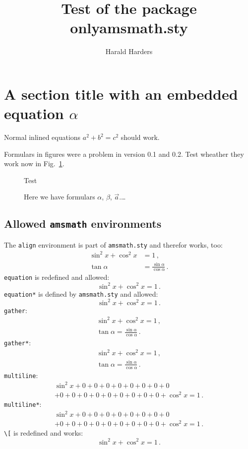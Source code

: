 \documentclass[fleqn]{article}
\begin{document}
\author{Harald Harders}
\title{Test of the package onlyamsmath.sty}

\maketitle
\tableofcontents
\listoffigures

\section{A section title with an embedded equation $\alpha$}

Normal inlined equations $a^2+b^2=c^2$ should work.

Formulars in figures were a problem in version 0.1 and 0.2. 
Test wheather they work now in Fig.~\ref{fig:example}.
\begin{figure}
  \centering
  Test
  \caption{Here we have formulars $\alpha$, $\beta$, $\vec{a}$.\dots}
  \label{fig:example}
\end{figure}

\subsection{Allowed \texttt{amsmath} environments}

The \verb|align| environment is part of \verb|amsmath.sty| and
therefor works, too:
\begin{align}
  \sin^2x + \cos^2x &=1\,,\\
  \tan\alpha &= \frac{\sin\alpha}{\cos\alpha}\,.
\end{align}
\verb|equation| is redefined and allowed:
\begin{equation}
  \sin^2x + \cos^2x = 1\,.
\end{equation}
\verb|equation*| is defined by \verb|amsmath.sty| and allowed:
\begin{equation*}
  \sin^2x + \cos^2x = 1\,.
\end{equation*}
\verb|gather|:
\begin{gather}
  \sin^2x + \cos^2x =1\,,\\
  \tan\alpha = \frac{\sin\alpha}{\cos\alpha}\,.
\end{gather}
\verb|gather*|:
\begin{gather*}
  \sin^2x + \cos^2x =1\,,\\
  \tan\alpha = \frac{\sin\alpha}{\cos\alpha}\,.
\end{gather*}
\verb|multiline|:
\begin{multline}
  \sin^2x +  0 + 0 + 0 + 0 + 0 + 0 + 0 + 0 \\
  + 0 + 0 + 0 + 0 + 0 + 0 + 0 + 0 + 0 +  \cos^2x =1\,.
\end{multline}
\verb|multiline*|:
\begin{multline*}
  \sin^2x +  0 + 0 + 0 + 0 + 0 + 0 + 0 + 0 \\
  + 0 + 0 + 0 + 0 + 0 + 0 + 0 + 0 + 0 +  \cos^2x =1\,.
\end{multline*}
\verb|\[| is redefined and works:
\[
  \sin^2x + \cos^2x = 1\,.
\]
\end{document}

